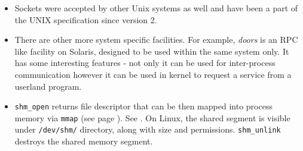\begin{itemize}
\item Sockets were accepted by other Unix systems as well and have been a part
of the UNIX specification since version 2.
\item There are other more system specific facilities.  For example,
\emph{doors} is an RPC like facility on Solaris, designed to be used within the
same system only. It has some interesting features - not only it can be used for
inter-process communication however it can be used in kernel to request a
service from a userland program.
\item \texttt{shm\_open} returns file descriptor that can be then
mapped into process memory via \texttt{mmap} (see page \pageref{MMAP}).
See .
On Linux, the shared segment is visible under \texttt{/dev/shm/} directory,
along with size and permissions. \texttt{shm\_unlink} destroys the shared
memory segment.
\end{itemize}


\endinput
